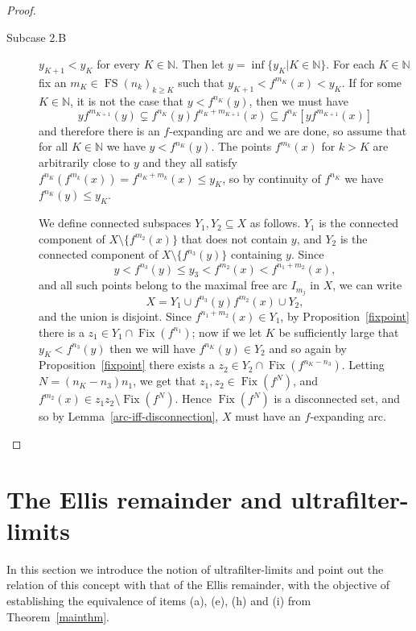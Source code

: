 \documentclass[12pt]{amsart}
\theoremstyle{definition}
\numberwithin{equation}{section}
\DeclareMathOperator{\fix}{Fix}
\DeclareMathOperator{\fs}{FS}
\begin{document}
\begin{proof}
\begin{description}
\item[Subcase 2.B] $y_{K+1}<y_K$ for every $K\in\mathbb N.$ Then let $y=\inf\{y_K\big|K\in\mathbb N\}$. For each $K\in\mathbb N$ fix an $m_K\in\fs(n_k)_{k\geq K}$ such that $y_{K+1}<f^{m_K}(x)<y_K$. If for some $K\in\mathbb N$, it is not the case that $y<f^{n_K}(y)$, then we must have 
$$
y f^{m_{K+1}}(y)\subsetneq f^{n_K}(y) f^{n_K+m_{K+1}}(x)\subseteq f^{n_K}[y f^{m_{K+1}}(x)]
$$
\noindent  and therefore there is an $f$-expanding arc and we are done, so assume that for all $K\in\mathbb N$ we have $y<f^{n_K}(y)$. The points $f^{m_k}(x)$ for $k>K$ are arbitrarily close to $y$ and they all satisfy $f^{n_K}(f^{m_k}(x))=f^{n_K+m_k}(x)\leq y_K$, so by continuity of $f^{n_K}$ we have $f^{n_K}(y)\leq y_K$.

We define connected subspaces $Y_1,Y_2\subseteq X$ as follows. $Y_1$ is the connected component of 
$X\setminus\{f^{m_2}(x)\}$ that does not contain $y$, and $Y_2$ is the connected component of 
$X\setminus\{f^{n_3}(y)\}$ containing $y$. Since 
$$
y<f^{n_3}(y)\leq y_3<f^{m_2}(x)<f^{n_1+m_2}(x),
$$ 
\noindent and all such points belong to the maximal free arc $I_{m_j}$ in $X$, we can write 
$$
X=Y_1\cup f^{n_3}(y) f^{m_2}(x)\cup Y_2,
$$ 
\noindent and the union is disjoint. Since $f^{n_1+m_2}(x)\in Y_1$, by Proposition~\ref{fixpoint} there is a 
$z_1\in Y_1\cap\fix(f^{n_1})$; now if we let $K$ be sufficiently large that $y_K<f^{n_3}(y)$ then we will have 
$f^{n_K}(y)\in Y_2$ and so again by Proposition~\ref{fixpoint} there exists a $z_2\in Y_2\cap\fix(f^{n_K-n_3})$. 
Letting $N=(n_K-n_3)n_1$, we get that $z_1,z_2\in\fix(f^N)$, and $f^{m_2}(x)\in z_1 z_2\setminus\fix(f^N)$. 
Hence $\fix(f^N)$ is a disconnected set, and so by Lemma~\ref{arc-iff-disconnection}, $X$ must have an 
$f$-expanding arc.
\end{description}
\end{proof}

\section{The Ellis remainder and ultrafilter-limits}\label{sect:ultrafilters}

In this section we introduce the notion of ultrafilter-limits and point out the relation of this concept with that of 
the Ellis remainder, with the objective of establishing the equivalence of items (a), (e), (h) and (i) from Theorem~\ref{mainthm}. 
\end{document}
